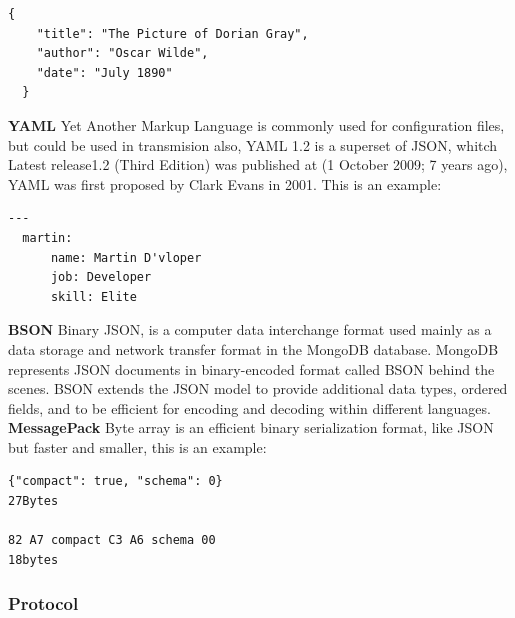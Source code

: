 \begin{lstlisting}[frame=none,numbers=none]
  {
    "title": "The Picture of Dorian Gray",
    "author": "Oscar Wilde",
    "date": "July 1890"
  }
\end{lstlisting}


\noindent \textbf{YAML}
\intro
Yet Another Markup Language is commonly used for configuration files, but could
be used in transmision also, YAML 1.2 is a superset of JSON, whitch Latest release1.2
(Third Edition) was published at (1 October 2009; 7 years ago), YAML was first
proposed by Clark Evans in 2001. This is an example:

\begin{lstlisting}[frame=none,numbers=none]
  ---
  martin:
      name: Martin D'vloper
      job: Developer
      skill: Elite
\end{lstlisting}


\noindent \textbf{BSON}
\intro
Binary JSON, is a computer data interchange format used mainly as a data storage
and network transfer format in the MongoDB database.
MongoDB represents JSON documents in binary-encoded format called BSON behind
the scenes. BSON extends the JSON model to provide additional data types,
ordered fields, and to be efficient for encoding and decoding within different languages.
\intro
\noindent \textbf{MessagePack}
\intro
Byte array is an efficient binary serialization format, like JSON but faster and smaller,
this is an example:

\begin{lstlisting}[frame=none,numbers=none]
{"compact": true, "schema": 0}
27Bytes

82 A7 compact C3 A6 schema 00
18bytes
\end{lstlisting}

\subsubsection{Protocol}

